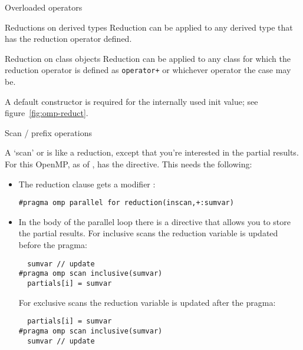  {Overloaded operators}

\begin{fortrannote}{Reductions on derived types}
  Reduction can be applied to any derived type that has the
  reduction operator defined.
  \begin{multicols}{2}
    \columnbreak
  \end{multicols}
  
\end{fortrannote}

\begin{cppnote}{Reduction on class objects}
  Reduction can be applied to any class for which the
  reduction operator is defined as \lstinline{operator+}
  or whichever operator the case may be.
  \begin{multicols}{2}
    \columnbreak
  \end{multicols}
  A default constructor is required for the
  internally used init value;
  see figure~\ref{fig:omp-reduct}.
\end{cppnote}


 {Scan / prefix operations}

A `scan' or 
is like a reduction, except that you're interested
in the partial results.
For this OpenMP, as of , has the  directive.
This needs the following:
\begin{itemize}
\item The reduction clause gets a modifier :
\begin{lstlisting}
#pragma omp parallel for reduction(inscan,+:sumvar)
\end{lstlisting}
\item In the body of the parallel loop there is a  directive
  that allows you to store the partial results.
  For inclusive scans the reduction variable is updated before the  pragma:
\begin{lstlisting}
  sumvar // update
#pragma omp scan inclusive(sumvar)
  partials[i] = sumvar
\end{lstlisting}
  For exclusive scans the reduction variable is updated after the  pragma:
\begin{lstlisting}
  partials[i] = sumvar
#pragma omp scan inclusive(sumvar)
  sumvar // update
\end{lstlisting}
\end{itemize}

